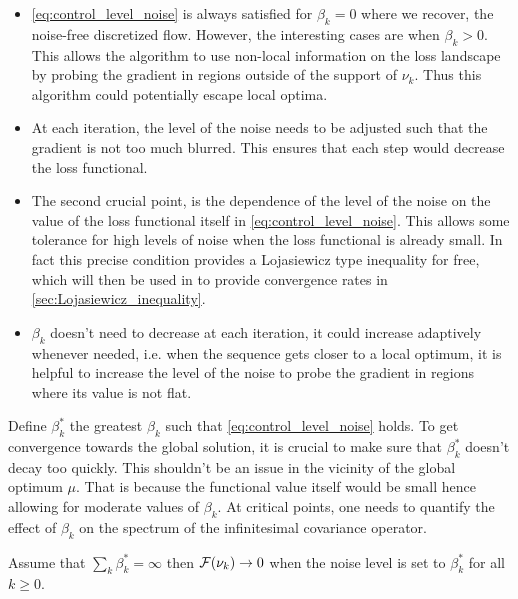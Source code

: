 \begin{remark}

\begin{itemize}
	\item \cref{eq:control_level_noise} is always satisfied for $\beta_k = 0$ where we recover, the noise-free discretized flow. However, the interesting cases are when $\beta_k>0$. This allows the algorithm to use non-local information on the loss landscape by probing the gradient in regions outside of the support of $\nu_k$. Thus this algorithm could potentially escape local optima. 
	\item At each iteration, the level of the noise needs to be adjusted such that the gradient is not too much blurred. This ensures that each step would decrease the loss functional.
	\item The second crucial point, is the dependence of the level of the noise on the value of the loss functional itself in \cref{eq:control_level_noise}. This allows some tolerance for high levels of noise when the loss functional is already small. In fact this precise condition provides a Lojasiewicz type inequality for free, which will then be used in  to provide convergence rates in  \cref{sec:Lojasiewicz_inequality}.
	\item $\beta_k$ doesn't need to decrease at each iteration, it could increase adaptively whenever needed, i.e. when  the sequence gets closer to a local optimum, it is helpful to increase the level of the noise to probe the gradient in regions where its value is not flat.
\end{itemize}
 \end{remark}
 
 Define $\beta_k^{*}$ the greatest $\beta_k$ such that \cref{eq:control_level_noise} holds. To get convergence towards the global solution, it is crucial to make sure that $\beta_k^{*}$ doesn't decay too quickly. This shouldn't be an issue in the vicinity of the global optimum $\mu$. That is because the functional value itself would be small hence allowing for moderate values of $\beta_k$. At critical points, one needs to quantify the effect of $\beta_k$ on the spectrum of the infinitesimal covariance operator.   
 
 
 \begin{theorem}\label{thm:convergence}
 Assume that $\sum_{k} \beta_k^{*} = \infty$ then ${{\mathcal F}}(\nu_k)\rightarrow 0$ when the noise level is set to $\beta_k^{*}$ for all $k\geq0$. 
 \end{theorem}
